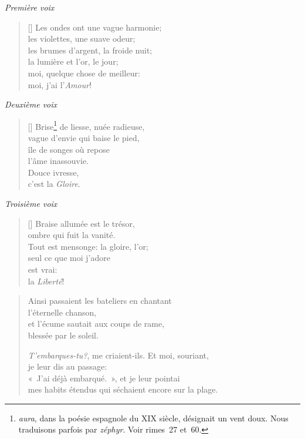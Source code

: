 \documentclass[a4paper,12pt]{book}
\begin{document}

\begin{center} \emph{Première voix} \end{center}

\begin{verse}[\versewidth]
  Les ondes ont une vague harmonie; \\
  les violettes, une suave odeur; \\
  les brumes d'argent, la froide nuit; \\
  la lumière et l'or, le jour; \\
  moi, quelque chose de meilleur: \\
  moi, j'ai l'\emph{Amour}!
\end{verse}

\smallskip

\begin{center} \emph{Deuxième voix} \end{center}

\begin{verse}[\versewidth]
  Brise\footnote{\emph{aura}, dans la poésie espagnole du XIX\ieme{}
  siècle, désignait un vent doux. Nous traduisons parfois par
  \emph{zéphyr}. Voir rimes~27 et~60.} de liesse, nuée radieuse, \\
  vague d'envie qui baise le pied, \\
  île de songes où repose \\
  l'âme inassouvie. \\
  Douce ivresse, \\
  c'est la \emph{Gloire}.
\end{verse}

\begin{center} \emph{Troisième voix} \end{center}

\begin{verse}[\versewidth]
  Braise allumée est le trésor, \\
  ombre qui fuit la vanité. \\
  Tout est mensonge: la gloire, l'or; \\
  seul ce que moi j'adore \\
  est vrai: \\
  la \emph{Liberté}!
\end{verse}

\begin{verse}
  Ainsi passaient les bateliers en chantant \\
  l'éternelle chanson, \\
  et l'écume sautait aux coups de rame, \\
  blessée par le soleil.

  \emph{T'embarques-tu?}, me criaient-ils. Et moi, souriant, \\
  je leur dis au passage: \\
  «~J'ai déjà embarqué.~», et je leur pointai \\
  mes habits étendus qui séchaient encore sur la plage.
\end{verse}
\end{document}
